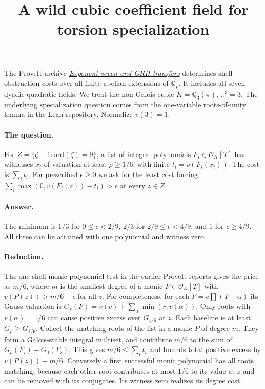 \documentclass[11pt]{article}
\title{A wild cubic coefficient field for torsion specialization}
\author{}\date{}
\begin{document}
\maketitle
\noindent The ProveIt archive
\href{https://github.com/VladimirReshetnikov/ProveIt/blob/5ed40f562710fcc2770bbb463dba528a6727f7ae/docs/incoming/exponent_seven_and_grh_transfers.zip}{\emph{Exponent seven and GRH transfers}}
determines shell obstruction costs over all finite abelian extensions of
$\mathbb Q_p$. It includes all seven dyadic quadratic fields.
We treat the non-Galois cubic $K=\mathbb Q_3(\pi)$, $\pi^3=3$. The
underlying specialization question comes from
\href{https://github.com/lsernau/grh-lean/blob/72fead102f663d5c7a407964a13dc0cf9d977207/grh/src/New/Congruences/Selmer/RootsOfUnity.lean#L300}{the one-variable roots-of-unity lemma}
in the Lean repository. Normalize $v(3)=1$.
\paragraph{The question.} For $Z=\{\zeta-1:\mathrm{ord}(\zeta)=9\}$,
a list of integral polynomials $F_i\in\mathcal O_K[T]$ has witnesses $x_i$
of valuation at least $\rho\ge1/6$, with finite $t_i=v(F_i(x_i))$.
The cost is $\sum_i t_i$. For prescribed $\epsilon\ge0$ we ask for the
least cost forcing $\sum_i\max(0,v(F_i(z))-t_i)>\epsilon$ at every $z\in Z$.

\paragraph{Answer.} The minimum is $1/3$ for $0\le\epsilon<2/9$,
$2/3$ for $2/9\le\epsilon<4/9$, and $1$ for $\epsilon\ge4/9$.
All three can be attained with one polynomial and witness zero.

\paragraph{Reduction.} The one-shell monic-polynomial test in the earlier
ProveIt reports gives the price as $m/6$, where $m$ is the smallest degree
of a monic $P\in\mathcal O_K[T]$ with $v(P(z))>m/6+\epsilon$ for all $z$.
For completeness, for each $F=c\prod(T-\alpha)$ its Gauss valuation is
$G_r(F)=v(c)+\sum_\alpha\min(r,v(\alpha))$.
Only roots with $v(\alpha)=1/6$ can cause positive excess over $G_{1/6}$
at $z$. Each baseline is at least $G_\rho\ge G_{1/6}$. Collect the matching
roots of the list in a monic $P$ of degree $m$. They form a Galois-stable
integral multiset, and contribute $m/6$ to the sum of
$G_\rho(F_i)-G_0(F_i)$. This gives $m/6\le\sum_i t_i$ and bounds total
positive excess by $v(P(z))-m/6$. Conversely a first successful monic
polynomial has all roots matching, because each other root contributes
at most $1/6$ to its value at $z$ and can be removed with its conjugates.
Its witness zero realizes its degree cost.
\end{document}
